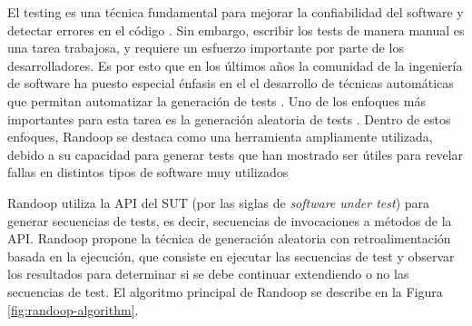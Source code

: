             
            
                
    
El testing es una técnica fundamental para mejorar la confiabilidad del software
y detectar errores en el código \cite{Ammann16}. 
Sin embargo, escribir los tests de manera manual es una tarea trabajosa, y
requiere un esfuerzo importante por parte de los desarrolladores. Es por esto
que en los últimos años la comunidad de la ingeniería de software ha puesto especial énfasis en el
el desarrollo de técnicas automáticas que permitan automatizar la generación de
tests \cite{Boyapati02,Khurshid01,Fraser11,Visser05,Pasareanu:2010,Cadar08,Tillmann:2010,Ma15,Ponzio:2016,Rosner14}.
Uno de los enfoques más importantes para esta tarea es la generación aleatoria
de tests \cite{Chen19,Li18,Ramler12,Shamshiri15}. 
Dentro de estos enfoques, Randoop se destaca como una herramienta ampliamente
utilizada, debido a su capacidad para generar tests que han mostrado ser útiles para revelar
fallas en distintos tipos de software muy utilizados \cite{Pacheco07,Pacheco08,Shamshiri15,just2014mutants}

Randoop utiliza la API del SUT (por las siglas de \emph{software under test}) para generar secuencias de tests, es decir,
secuencias de invocaciones a métodos de la API. Randoop propone la técnica
de generación aleatoria con retroalimentación basada en la ejecución, que
consiste en ejecutar las secuencias de test y observar los resultados para 
determinar si se debe continuar extendiendo o no las secuencias de test. 
El algoritmo principal de Randoop se describe en la Figura \ref{fig:randoop-algorithm}.

